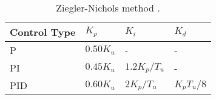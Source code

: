 \begin{table}[H]
\centering
\begin{tabular}{|l|l|l|l|}
\hline
\textbf{Control Type} & \textbf{$K_p$}     & \textbf{$K_i$}        & \textbf{$K_d$}      \\ \hline
P            & $0.50K_u$ & -            & -          \\ \hline
PI           & $0.45K_u$ & $1.2K_p/T_u$ & -          \\ \hline
PID          & $0.60K_u$ & $2K_p/T_u$   & $K_pT_u/8$ \\ \hline
\end{tabular}
\caption{Ziegler-Nichols method \cite{Ziegler-Nichols}.}
\label{Ziegler-Nichols_Method}
\end{table}
\FloatBarrier